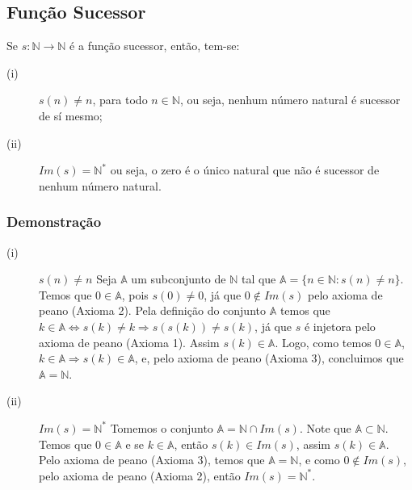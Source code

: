 \subsection*{Função Sucessor}
Se $s : \mathbb{N} \longrightarrow \mathbb{N}$ é a função sucessor, então, tem-se:
\begin{description}
    \item[(i)] $s(n) \neq n$, para todo $n \in \mathbb{N}$, ou seja, nenhum número natural é sucessor de sí mesmo;
    \item[(ii)] $Im(s) = \mathbb{N}^*$ ou seja, o zero é o único natural que não é sucessor de nenhum
    número natural.
\end{description}

\subsubsection*{Demonstração}
\begin{description}
    \item[(i)] $s(n) \neq n$ \newline
    Seja $\mathbb{A}$ um subconjunto de $\mathbb{N}$ tal que $\mathbb{A} = \{n \in \mathbb{N} : s(n) \neq n\}$. \newline
    Temos que $0 \in \mathbb{A}$, pois $s(0) \neq 0$, já que $0 \notin Im(s)$ pelo axioma de peano (Axioma 2). \newline
    Pela definição do conjunto $\mathbb{A}$ temos que $k \in \mathbb{A} \Leftrightarrow s(k) \neq k \Rightarrow s(s(k)) \neq s(k)$, já que $s$ é injetora pelo axioma de peano (Axioma 1). \newline
    Assim $s(k) \in \mathbb{A}$. Logo, como temos $0 \in \mathbb{A}$, $k \in \mathbb{A} \Rightarrow s(k) \in \mathbb{A}$, e, pelo axioma de peano (Axioma 3), concluimos que $\mathbb{A} = \mathbb{N}$.

    \item[(ii)] $Im(s) = \mathbb{N}^*$ \newline
    Tomemos o conjunto $\mathbb{A} = \mathbb{N} \cap Im(s)$. Note que $\mathbb{A} \subset \mathbb{N}$. \newline
    Temos que $0 \in \mathbb{A}$ e se $k \in \mathbb{A}$, então $s(k) \in Im(s)$, assim $s(k) \in \mathbb{A}$.
    Pelo axioma de peano (Axioma 3), temos que $\mathbb{A} = \mathbb{N}$, e como $0 \notin Im(s)$, pelo axioma de peano (Axioma 2), então $Im(s) = \mathbb{N}^*$.
\end{description}